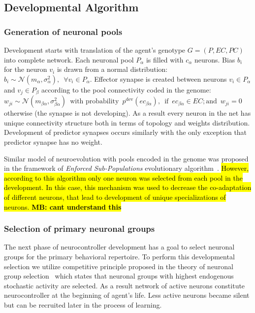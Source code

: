 \documentclass[letterpaper]{article}
\begin{document}
\subsection{Developmental Algorithm}

\subsubsection{Generation of neuronal pools} Development starts with translation of the agent's genotype $G = \left( P, EC, PC\right)$ into complete network. Each neuronal pool $P_{\alpha}$ is filled with $c_{\alpha}$ neurons. Bias $b_{i}$ for the neuron $v_{i}$ is drawn from a normal distribution: $b_{i}\sim \mathcal{N} \left(m_{\alpha},\sigma^2_{\alpha}\right), \enspace \forall v_{i} \in P_{\alpha}$. Effector synapse is created between neurons $v_{i} \in P_{\alpha}$ and  $v_{j}\in P_{\beta}$  according to the pool connectivity coded in the genome: $ w_{ji} \sim \mathcal{N} \left(m_{\beta\alpha},\sigma^2_{\beta\alpha}\right)\enspace \mbox{with probability} \enspace p^{\mathrm{dev}}\left(ec_{\beta\alpha}\right),\enspace \mbox{if} \enspace ec_{\beta\alpha} \in EC ; \mbox{and} \enspace w_{ji} = 0$ otherwise (the synapse is not developing). As a result every neuron in the net has unique connectivity structure both in terms of topology and weights distribution. Development of predictor synapses occurs similarly with the only exception that predictor synapse has no weight.

Similar model of neuroevolution with pools encoded in the genome was  proposed in the framework of {\em Enforced Sub-Populations} evolutionary algorithm~\citep{GomezMiikkulainen1999}. \hl{However, according to this algorithm only one neuron was selected from each pool in the development.  In this case, this mechanism was used to decrease the co-adaptation of different neurons, that lead to development of unique specializations of neurons. \textbf{MB: cant understand this}}

\subsubsection{Selection of primary neuronal groups} The next phase of neurocontroller development has a goal to select neuronal groups for the primary behavioral repertoire. To perform this developmental selection we utilize competitive principle proposed in the theory of neuronal group selection~\citep{Edelman1993} which states that neuronal groups with highest endogenous stochastic activity are selected. As a result network of active neurons constitute  neurocontroller at the beginning of agent's life. Less active neurons became silent but can be recruited later in the process of learning.
\end{document}
